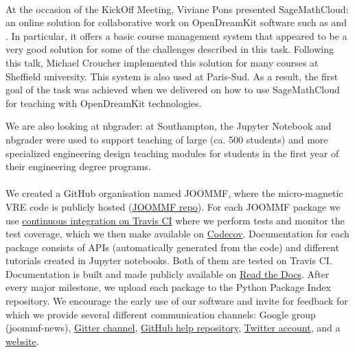 \documentclass{deliverablereport}
\begin{document}
\paragraph{}

At the occasion of the KickOff Meeting, Viviane Pons presented SageMathCloud: an online solution for collaborative
work on OpenDreamKit software such as \Sage and \Jupyter. In particular, it offers a basic course management system that appeared to be a very good solution for some of the challenges described in this task. Following this talk, Michael Croucher implemented this solution for many courses at Sheffield university. This system is also used at Paris-Sud. As a result, the first goal of the task was achieved when we delivered  on how to use SageMathCloud for teaching with OpenDreamKit technologies. 

We are also looking at nbgrader: at Southampton, the Jupyter Notebook and nbgrader were used to support teaching of large (ca. 500 students) and more specialized engineering design teaching modules for students in the first year of their engineering degree programs.

\paragraph{}
\label{dissem@dissemination-of-oommf-nb-virtual-environment}

We created a GitHub organisation named JOOMMF, where the micro-magnetic VRE code is publicly hosted (\href{https://github.com/joommf}{JOOMMF repo}). For each JOOMMF package we use \href{https://travis-ci.org/joommf/discretisedfield}{continuous integration on Travis CI} where we perform tests and monitor the test coverage, which we then make available on \href{https://codecov.io/}{Codecov}. Documentation for each package consists of APIs (automatically generated from the code) and different tutorials created in Jupyter notebooks. Both of them are tested on Travis CI. Documentation is built and made publicly available on \href{http://discretisedfield.readthedocs.io}{Read the Docs}. After every major milestone, we upload each package to the Python Package Index repository. We encourage the early use of our software and invite for feedback for which we provide several different communication channels: Google group (joommf-news), \href{https://gitter.im/joommf/}{Gitter channel}, \href{https://github.com/joommf/help}{GitHub help repository}, \href{https://twitter.com/joommf}{Twitter account}, and a \href{http://joommf.github.io/}{website}.
\end{document}
